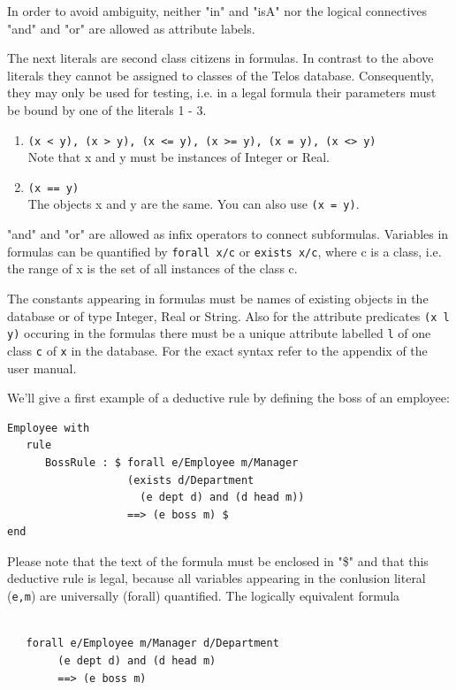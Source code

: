 \documentclass[10pt,a4paper]{article}
\begin{document}
In order to avoid ambiguity, neither "in" and "isA" nor the logical
connectives "and" and "or" are allowed as attribute labels.

The next literals are second class citizens in formulas. In contrast to the
above literals they cannot be assigned to classes of the Telos database.
Consequently, they may only be used for testing, i.e. in a legal formula their
parameters must be bound by one of the literals 1 - 3.

\begin{enumerate}
\item[4] {\tt (x < y), (x > y), (x <= y), (x >= y), (x = y), (x <> y)}\\
  Note that x and y must be instances of Integer or Real.
\item[5] {\tt (x == y)}\\
  The objects x and y are the same. You can also use {\tt (x = y)}.
\end{enumerate}

"and" and "or" are allowed as infix operators to connect subformulas.
Variables in formulas can be quantified by {\tt forall x/c} or
{\tt exists x/c}, where c is a class, i.e. the range of x is
the set of all instances of the class c.

The constants appearing in formulas must be names of
existing objects in the database or of type Integer, Real or
String. Also for the attribute predicates {\tt (x l y)} occuring in the
formulas there must be a unique attribute labelled {\tt l} of one class
{\tt c} of {\tt x} in the database. For the exact syntax refer to the
appendix of the user manual.

We'll give a first example of a deductive rule by defining the boss of an
employee:

\begin{verbatim}
Employee with
   rule
      BossRule : $ forall e/Employee m/Manager
                   (exists d/Department
                     (e dept d) and (d head m))
                   ==> (e boss m) $
end
\end{verbatim}

Please note that the text of the formula must be enclosed in "\$" and that
this deductive rule is legal, because all variables appearing in the conlusion
literal ({\tt e,m}) are universally (forall) quantified. The logically
equivalent formula

\begin{verbatim}

   forall e/Employee m/Manager d/Department
        (e dept d) and (d head m)
        ==> (e boss m)
\end{verbatim}
\end{document}
